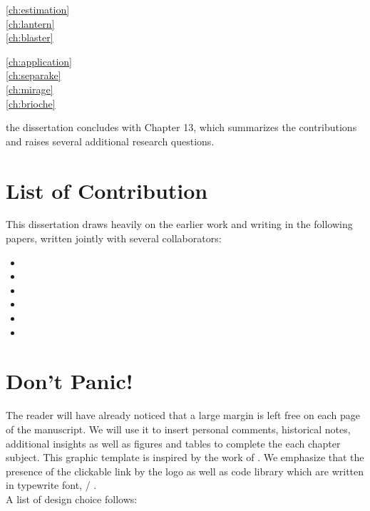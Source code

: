 \begin{description}
    \item[\cref{ch:estimation}]\synopsisChEstimation
    \item[\cref{ch:lantern}]\synopsisChLantern
    \item[\cref{ch:blaster}]\synopsisChBlaster
\end{description}


\begin{description}
\item[\cref{ch:application}]\synopsisChApplication
\item[\cref{ch:separake}]\synopsisChSeparake
\item[\cref{ch:mirage}]\synopsisChMirage
\item[\cref{ch:brioche}]\synopsisChDecharateApp
\end{description}

 the dissertation concludes with Chapter 13, which summarizes the contributions and raises several additional research questions.


\section{List of Contribution}
This dissertation draws heavily on the earlier work and writing in the following papers, written jointly with several collaborators:

\begin{itemize}
    \item {}
    \item {}
    \item {}
    \item {}
    \item {}
    \item {}
\end{itemize}


\section{Don't Panic!}
The reader will have already noticed that a large margin is left free on each page of the manuscript.
We will use it to insert personal comments, historical notes, additional insights as well as figures and tables to complete the each chapter subject.
This graphic template is inspired by the work of \citeauthor{tufte1983visual}
.
We emphasize that the presence of the clickable link by the \ExternalLink logo as well as code library which are written in typewrite font, \eg/ .
\\A list of design choice follows:

